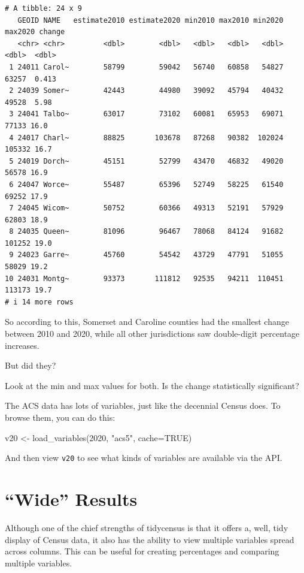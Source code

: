 \documentclass[
  letterpaper,
  DIV=11,
  numbers=noendperiod]{scrreprt}
\newenvironment{Shaded}{\begin{snugshade}}{\end{snugshade}}
\newcommand{\AttributeTok}[1]{\textcolor[rgb]{0.40,0.45,0.13}{#1}}
\newcommand{\ConstantTok}[1]{\textcolor[rgb]{0.56,0.35,0.01}{#1}}
\newcommand{\DecValTok}[1]{\textcolor[rgb]{0.68,0.00,0.00}{#1}}
\newcommand{\FunctionTok}[1]{\textcolor[rgb]{0.28,0.35,0.67}{#1}}
\newcommand{\NormalTok}[1]{\textcolor[rgb]{0.00,0.23,0.31}{#1}}
\newcommand{\OtherTok}[1]{\textcolor[rgb]{0.00,0.23,0.31}{#1}}
\newcommand{\StringTok}[1]{\textcolor[rgb]{0.13,0.47,0.30}{#1}}
\begin{document}
\begin{verbatim}
# A tibble: 24 x 9
   GEOID NAME   estimate2010 estimate2020 min2010 max2010 min2020 max2020 change
   <chr> <chr>         <dbl>        <dbl>   <dbl>   <dbl>   <dbl>   <dbl>  <dbl>
 1 24011 Carol~        58799        59042   56740   60858   54827   63257  0.413
 2 24039 Somer~        42443        44980   39092   45794   40432   49528  5.98 
 3 24041 Talbo~        63017        73102   60081   65953   69071   77133 16.0  
 4 24017 Charl~        88825       103678   87268   90382  102024  105332 16.7  
 5 24019 Dorch~        45151        52799   43470   46832   49020   56578 16.9  
 6 24047 Worce~        55487        65396   52749   58225   61540   69252 17.9  
 7 24045 Wicom~        50752        60366   49313   52191   57929   62803 18.9  
 8 24035 Queen~        81096        96467   78068   84124   91682  101252 19.0  
 9 24023 Garre~        45760        54542   43729   47791   51055   58029 19.2  
10 24031 Montg~        93373       111812   92535   94211  110451  113173 19.7  
# i 14 more rows
\end{verbatim}

So according to this, Somerset and Caroline counties had the smallest
change between 2010 and 2020, while all other jurisdictions saw
double-digit percentage increases.

But did they?

Look at the min and max values for both. Is the change statistically
significant?

The ACS data has lots of variables, just like the decennial Census does.
To browse them, you can do this:

\begin{Shaded}
\begin{Highlighting}[]
\NormalTok{v20 }\OtherTok{\textless{}{-}} \FunctionTok{load\_variables}\NormalTok{(}\DecValTok{2020}\NormalTok{, }\StringTok{"acs5"}\NormalTok{, }\AttributeTok{cache=}\ConstantTok{TRUE}\NormalTok{)}
\end{Highlighting}
\end{Shaded}

And then view \texttt{v20} to see what kinds of variables are available
via the API.

\hypertarget{wide-results}{%
\section{``Wide'' Results}\label{wide-results}}

Although one of the chief strengths of tidycensus is that it offers a,
well, tidy display of Census data, it also has the ability to view
multiple variables spread across columns. This can be useful for
creating percentages and comparing multiple variables.
\end{document}
